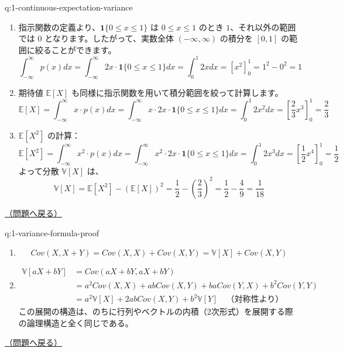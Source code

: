 \documentclass[
  pandoc]{bxjsarticle}
\providecommand{\tightlist}{%
  \setlength{\itemsep}{0pt}\setlength{\parskip}{0pt}}
\newcommand{\ind}{\mathbf{1}}
\begin{document}
\begin{answerbox}[phantomlabel=a:1-continuous-expectation-variance]{q:1-continuous-expectation-variance}

\begin{enumerate}
\def\labelenumi{\arabic{enumi}.}
\tightlist
\item
  指示関数の定義より、\(\ind\{0 \le x \le 1\}\) は \(0 \le x \le 1\)
  のとき \(1\)、それ以外の範囲では \(0\)
  となります。したがって、実数全体 \((-\infty, \infty)\) の積分を
  \([0, 1]\) の範囲に絞ることができます。 \[
   \int_{-\infty}^\infty p(x) dx = \int_{-\infty}^\infty 2x \cdot \ind\{0 \le x \le 1\} dx = \int_0^1 2x dx = \left[ x^2 \right]_0^1 = 1^2 - 0^2 = 1
   \]
\item
  期待値 \(\mathbb{E}[X]\)
  も同様に指示関数を用いて積分範囲を絞って計算します。 \[
   \mathbb{E}[X] = \int_{-\infty}^\infty x \cdot p(x) dx = \int_{-\infty}^\infty x \cdot 2x \cdot \ind\{0 \le x \le 1\} dx = \int_0^1 2x^2 dx = \left[ \frac{2}{3}x^3 \right]_0^1 = \frac{2}{3}
   \]
\item
  \(\mathbb{E}[X^2]\) の計算： \[
   \mathbb{E}[X^2] = \int_{-\infty}^\infty x^2 \cdot p(x) dx = \int_{-\infty}^\infty x^2 \cdot 2x \cdot \ind\{0 \le x \le 1\} dx = \int_0^1 2x^3 dx = \left[ \frac{1}{2}x^4 \right]_0^1 = \frac{1}{2}
   \] よって分散 \(\mathbb{V}[X]\) は、 \[
   \mathbb{V}[X] = \mathbb{E}[X^2] - (\mathbb{E}[X])^2 = \frac{1}{2} - \left(\frac{2}{3}\right)^2 = \frac{1}{2} - \frac{4}{9} = \frac{1}{18}
   \]
\end{enumerate}

\hfill 

\hyperref[q:1-continuous-expectation-variance]{（問題へ戻る）}

\end{answerbox}

\begin{answerbox}[phantomlabel=a:1-variance-formula-proof]{q:1-variance-formula-proof}

\begin{enumerate}
\def\labelenumi{\arabic{enumi}.}
\tightlist
\item
  \[Cov(X, X+Y) = Cov(X,X) + Cov(X,Y) = \mathbb{V}[X] + Cov(X,Y)\]
\item
  \begin{align*}
       \mathbb{V}[aX+bY] &= Cov(aX+bY, aX+bY) \\
       &= a^2 Cov(X,X) + ab Cov(X,Y) + ba Cov(Y,X) + b^2 Cov(Y,Y) \\
       &= a^2 \mathbb{V}[X] + 2ab Cov(X,Y) + b^2 \mathbb{V}[Y] \quad \text{（対称性より）}
       \end{align*}
  この展開の構造は、のちに行列やベクトルの内積（2次形式）を展開する際の論理構造と全く同じである。
\end{enumerate}

\hfill 

\hyperref[q:1-variance-formula-proof]{（問題へ戻る）}

\end{answerbox}
\end{document}
